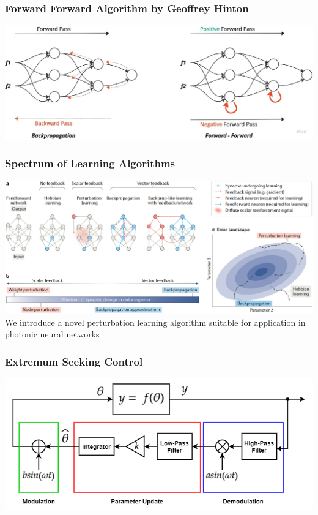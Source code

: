 \documentclass[
	11pt, %
]{beamer}
\begin{document}


\begin{frame}
  \frametitle{Forward Forward Algorithm by Geoffrey Hinton}
  \includegraphics[width=\columnwidth]{../report/images/FF_scheme.png}
\end{frame}


\begin{frame}
  \frametitle{Spectrum of Learning Algorithms}
  \includegraphics[width=\columnwidth]{../report/images/grad_landscape.png}
  We introduce a novel perturbation learning algorithm suitable for application in photonic neural networks
\end{frame}


\begin{frame}
  \frametitle{Extremum Seeking Control}
   \includegraphics[width=0.9\columnwidth]{../report/images/esc_static_optimization.png}
\end{frame}
\end{document}
